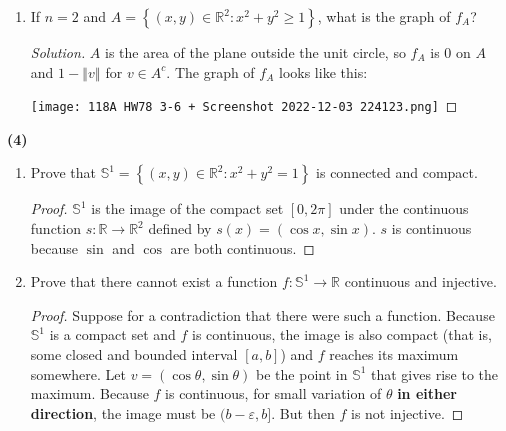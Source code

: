 \documentclass{article}
\newcommand{\R}{\mathbb{R}}
\newcommand{\N}{\mathbb{N}}
\newcommand{\set}[1]{\left\{ #1 \right\}}
\newcommand{\norm}[1]{\left\Vert #1 \right\Vert}
\newcommand{\ol}[1]{\overline{#1}}
\begin{document}
\begin{enumerate}
\begin{proof}
        ($\Longleftarrow$) Suppose $x \in \ol{A}$. By one characterization of the limit point, $\exists (x_n) \in A$ such that $\lim x_n = x$. (If $x \in A$, then we have the trivial $\forall n, x_n = x$.) Then $\forall n \in \N, f_A(x_n) = 0$ and uniformly continuous implies continuous implies we can interchange the function and the limit: $f_A(x) = f_A(\lim x_n) = \lim f_A(x_n) = 0$.         
    \end{proof}


    \item
    If $n = 2$ and $A = \set{(x, y) \in \R^2 : x^2 + y^2 \ge 1}$, what is the graph of $f_A$?
    \begin{proof}[Solution]
        $A$ is the area of the plane outside the unit circle, so $f_A$ is $0$ on $A$ and $1 - \norm{v}$ for $v \in A^c$. The graph of $f_A$ looks like this:

        \texttt{[image: 118A HW78 3-6 + Screenshot 2022-12-03 224123.png]}
    \end{proof}
\end{enumerate}

\newpage %

\textbf{(4)}
\renewcommand{\labelenumi}{(\alph{enumi})}
\begin{enumerate}
    \item 
    Prove that $\mathbb{S}^1 = \set{(x, y) \in \R^2 : x^2 + y^2 = 1}$ is connected and compact.
    \begin{proof}
        $\mathbb{S}^1$ is the image of the compact set $[0, 2\pi]$ under the continuous function $s : \R \to \R^2$ defined by $s(x) = (\cos x, \sin x)$. $s$ is continuous because $\sin$ and $\cos$ are both continuous. 
    \end{proof}


    \item 
    Prove that there cannot exist a function $f : \mathbb{S}^1 \to \R$ continuous and injective.
    \begin{proof}
        Suppose for a contradiction that there were such a function. Because $\mathbb{S}^1$ is a compact set and $f$ is continuous, the image is also compact (that is, some closed and bounded interval $[a, b]$) and $f$ reaches its maximum somewhere. Let $v = (\cos \theta, \sin \theta)$ be the point in $\mathbb{S}^1$ that gives rise to the maximum. Because $f$ is continuous, for small variation of $\theta$ \textbf{in either direction}, the image must be $(b - \varepsilon, b]$. But then $f$ is not injective.        
    \end{proof}
\end{enumerate}
\end{document}
